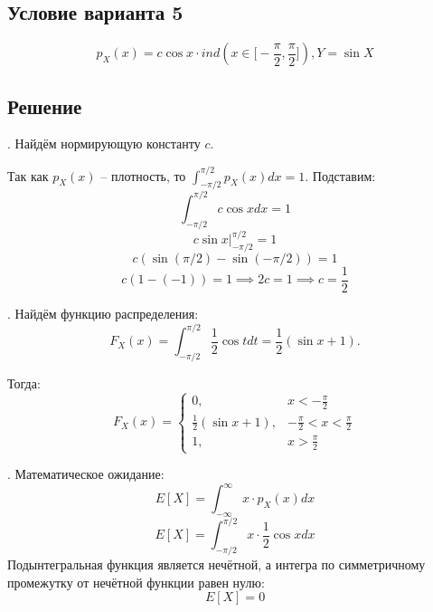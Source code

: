 \documentclass[a4paper,14pt]{extarticle}
\begin{document}
        \subsection*{Условие варианта 5}
        \[p_X(x) = c \cos x \cdot ind(x \in \big[-\frac{\pi}{2}, \frac{\pi}{2}\big]), Y = \sin X\]
        
        \subsection*{Решение}
        . Найдём нормирующую константу $c$. 

        Так как $p_X(x)$ -- плотность, то $\int_{-\pi/2}^{\pi/2} p_X(x) dx = 1$. Подставим:
        \[\int_{-\pi/2}^{\pi/2} c \cos x dx = 1\]
        \[c \sin x |^{\pi/2}_{-\pi/2} = 1\]
        \[c(\sin(\pi/2) - \sin(-\pi/2)) = 1\]
        \[c(1 - (-1)) = 1 \implies 2c = 1 \implies \boxed{c = \frac{1}{2}}\]
        
        . Найдём функцию распределения:
        \[F_X(x) = \int_{-\pi/2}^{\pi/2}\frac{1}{2}\cos t dt = \frac{1}{2} (\sin x + 1). \]
        
        Тогда: \[ \boxed{F_X (x)= \begin{cases}
            0, & x < -\frac{\pi}{2} \\
            \frac{1}{2} (\sin x + 1), & -\frac{\pi}{2} < x < \frac{\pi}{2} \\
            1, & x > \frac{\pi}{2}
        \end{cases}}\] 

        . Математическое ожидание:
        \[E[X] = \int_{-\infty}^{\infty} x \cdot p_X(x) dx\]
        \[E[X] = \int_{-\pi/2}^{\pi/2} x \cdot \frac{1}{2} \cos x dx\]
        Подынтегральная функция является нечётной, а интегра по симметричному промежутку от нечётной функции равен нулю:
        \[\boxed{E[X] = 0}\]
\end{document}
